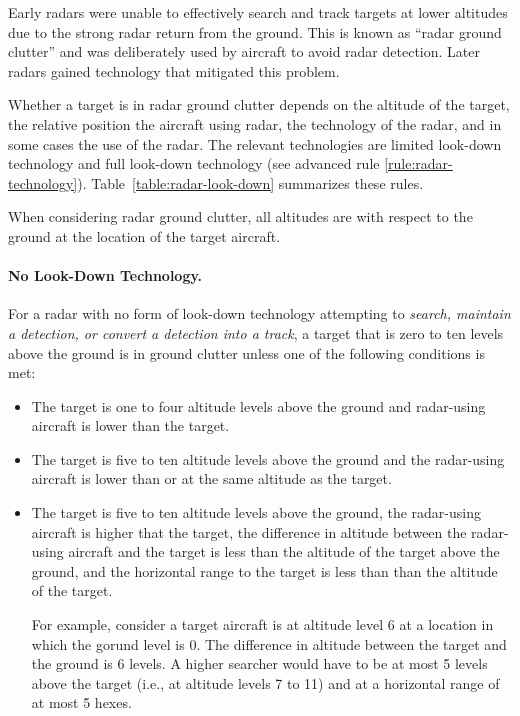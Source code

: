 {Early radars were unable to effectively search and track targets at lower altitudes due to the strong radar return from the ground. This is known as “radar ground clutter” and was deliberately used by aircraft to avoid radar detection. Later radars gained technology that mitigated this problem.

Whether a target is in radar ground clutter depends on the altitude of the target, the relative position the aircraft using radar, the technology of the radar, and in some cases the use of the radar. The relevant technologies are limited look-down technology and full look-down technology (see advanced rule \ref{rule:radar-technology}). Table~\ref{table:radar-look-down} summarizes these rules.

When considering radar ground clutter, all altitudes are with respect to the ground at the location of the target aircraft.


\paragraph{No Look-Down Technology.}
For a radar with no form of look-down technology attempting to \emph{search, maintain a detection, or convert a detection into a track}, a target that is zero to ten levels above the ground is in ground clutter unless one of the following conditions is met:
 

    \begin{itemize}

        \item The target is one to four altitude levels above the ground and radar-using aircraft is lower than the target.
        
        \item The target is five to ten altitude levels above the ground and the radar-using aircraft is lower than or at the same altitude as the target.
        
        \item The target is five to ten altitude levels above the ground, the radar-using aircraft is higher that the target, the difference in altitude between the radar-using aircraft and the target is less than the altitude of the target above the ground, and the horizontal range to the target is less than than the altitude of the target.
        
    For example, consider a target aircraft is at altitude level 6 at a location in which the gorund level is 0. The difference in altitude between the target and the ground is 6 levels. A higher searcher would have to be at most 5 levels above the target (i.e., at altitude levels 7 to 11) and at a horizontal range of at most 5 hexes.


\end{itemize}}
